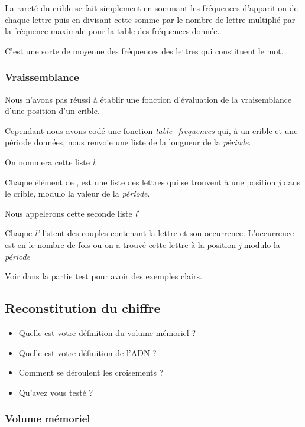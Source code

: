 \documentclass[a4paper, 11pt]{article}
\begin{document}
La rareté du crible se fait simplement en sommant les fréquences
d'apparition de chaque lettre puis en divisant cette somme par le
nombre de lettre multiplié par la fréquence maximale pour la table des
fréquences donnée.

C'est une sorte de moyenne des fréquences des lettres qui constituent
le mot.

\subsubsection{Vraissemblance}
Nous n'avons pas réussi à établir une fonction d'évaluation de la
vraisemblance d'une position d'un crible.

Cependant nous avons codé une fonction \textit{table\_frequences} qui, à un
crible et une période données, nous renvoie une liste de la longueur
de la \textit{période}.

On nommera cette liste \textit{l}.

Chaque élément de , est une liste des
lettres qui se trouvent à une position \textit{j} dans le crible, modulo
la valeur de la \textit{période}.

Nous appelerons cette seconde liste \textit{l$'$}

Chaque \textit{l'} listent des couples contenant la lettre et son
occurrence. L'occurrence est en le nombre de fois ou on a trouvé cette
lettre à la position \textit{j} modulo la \textit{période}

Voir dans la partie test pour avoir des exemples clairs.



\subsection{Reconstitution du chiffre}

\begin{itemize}
\item Quelle est votre définition du volume mémoriel ?
\item Quelle est votre définition de l'ADN ?
\item Comment se déroulent les croisements ?
\item Qu'avez vous testé ?
\end{itemize}


\subsubsection{Volume mémoriel}
\end{document}
